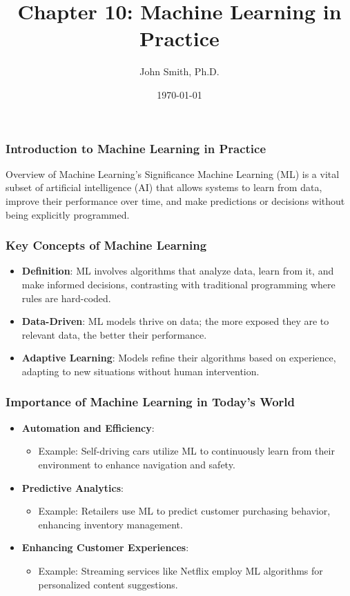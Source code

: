 \documentclass[aspectratio=169]{beamer}
\title[Machine Learning in Practice]{Chapter 10: Machine Learning in Practice}
\author[J. Smith]{John Smith, Ph.D.}
\institute[University Name]{
  Department of Computer Science\\
  University Name\\
  \vspace{0.3cm}
  Email: email@university.edu\\
  Website: www.university.edu
}
\date{\today}
\begin{document}
\frame{\titlepage}

\begin{frame}[fragile]
    \frametitle{Introduction to Machine Learning in Practice}
    \begin{block}{Overview of Machine Learning's Significance}
        Machine Learning (ML) is a vital subset of artificial intelligence (AI) that allows systems to learn from data, improve their performance over time, and make predictions or decisions without being explicitly programmed.
    \end{block}
\end{frame}

\begin{frame}[fragile]
    \frametitle{Key Concepts of Machine Learning}
    \begin{itemize}
        \item \textbf{Definition}: ML involves algorithms that analyze data, learn from it, and make informed decisions, contrasting with traditional programming where rules are hard-coded.
        \item \textbf{Data-Driven}: ML models thrive on data; the more exposed they are to relevant data, the better their performance.
        \item \textbf{Adaptive Learning}: Models refine their algorithms based on experience, adapting to new situations without human intervention.
    \end{itemize}
\end{frame}

\begin{frame}[fragile]
    \frametitle{Importance of Machine Learning in Today's World}
    \begin{itemize}
        \item \textbf{Automation and Efficiency}:
            \begin{itemize}
                \item Example: Self-driving cars utilize ML to continuously learn from their environment to enhance navigation and safety.
            \end{itemize}
        \item \textbf{Predictive Analytics}:
            \begin{itemize}
                \item Example: Retailers use ML to predict customer purchasing behavior, enhancing inventory management.
            \end{itemize}
        \item \textbf{Enhancing Customer Experiences}:
            \begin{itemize}
                \item Example: Streaming services like Netflix employ ML algorithms for personalized content suggestions.
            \end{itemize}
    \end{itemize}
\end{frame}
\end{document}
